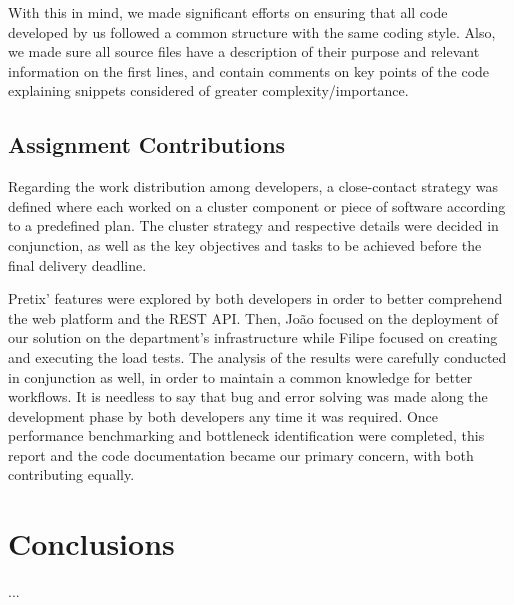 \documentclass[12pt]{article}
\begin{document}
With this in mind, we made significant efforts on ensuring that all code developed by us followed a common structure with the same coding style.
Also, we made sure all source files have a description of their purpose and relevant information on the first lines, and contain comments on key points of the
code explaining snippets considered of greater complexity/importance.

\subsection{Assignment Contributions} \label{remarks.contributions} %


Regarding the work distribution among developers, a close-contact strategy was defined where each worked on a cluster component or piece of software according
to a predefined plan.
The cluster strategy and respective details were decided in conjunction, as well as the key objectives and tasks to be achieved before the final delivery deadline.

Pretix' features were explored by both developers in order to better comprehend the web platform and the REST API.
Then, João focused on the deployment of our solution on the department's infrastructure while Filipe focused on creating and executing the load tests.
The analysis of the results were carefully conducted in conjunction as well, in order to maintain a common knowledge for better workflows.
It is needless to say that bug and error solving was made along the development phase by both developers any time it was required.
Once performance benchmarking and bottleneck identification were completed, this report and the code documentation became our primary concern, with both
contributing equally.

\newpage
\section*{Conclusions} \label{conclusions} %

...
\end{document}
